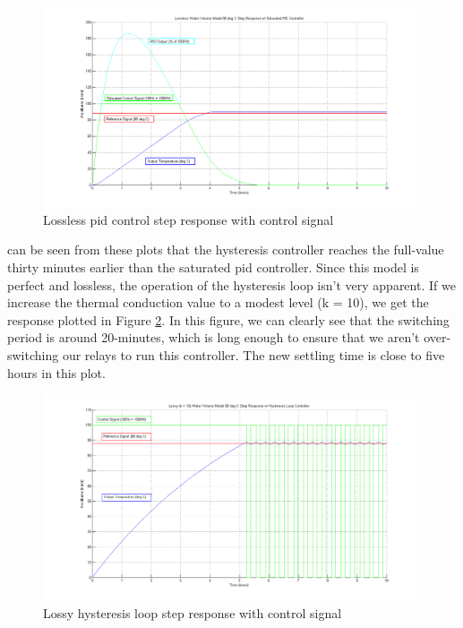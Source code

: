 \documentclass{article}
\begin{document}
\begin{figure}[H]
\begin{center}
\includegraphics[scale=0.30]{pid-step-lossless.png}
\caption{Lossless \gls{pid} control step response with control signal}
\label{fig:pid-step-lossless}
\end{center}
\end{figure}

 can be seen from these plots that the hysteresis controller reaches the full-value thirty minutes earlier than the saturated \gls{pid} controller. Since this model is perfect and lossless, the operation of the hysteresis loop isn't very apparent. If we increase the thermal conduction value to a modest level (k = 10), we get the response plotted in Figure \ref{fig:hysteresis-step-lossy}. In this figure, we can clearly see that the switching period is around 20-minutes, which is long enough to ensure that we aren't over-switching our relays to run this controller. The new settling time is close to five hours in this plot.

\begin{figure}[H]
\begin{center}
\includegraphics[scale=0.30]{hysteresis-step-lossy.png}
\caption{Lossy hysteresis loop step response with control signal}
\label{fig:hysteresis-step-lossy}
\end{center}
\end{figure}
\end{document}
